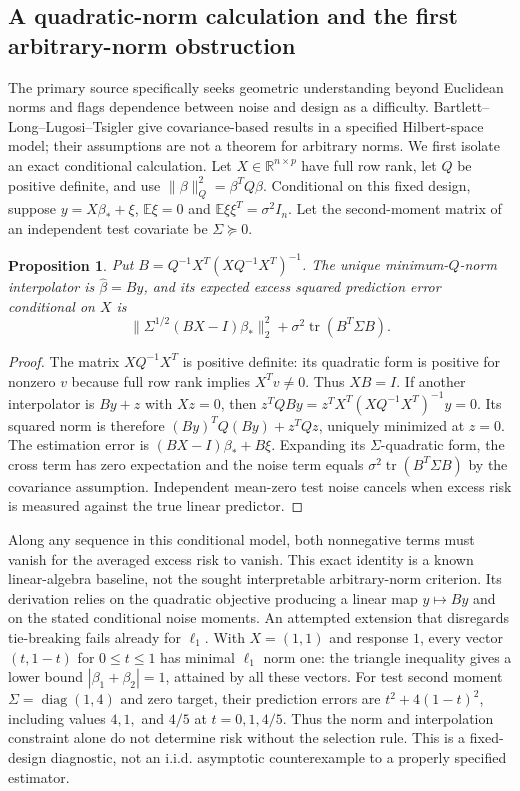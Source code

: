\documentclass[11pt]{article}
\newtheorem{proposition}{Proposition}
\begin{document}
\subsection{A quadratic-norm calculation and the first arbitrary-norm obstruction}
The primary source specifically seeks geometric understanding beyond Euclidean norms and flags dependence between noise and design as a difficulty. Bartlett--Long--Lugosi--Tsigler give covariance-based results in a specified Hilbert-space model; their assumptions are not a theorem for arbitrary norms. We first isolate an exact conditional calculation. Let $X\in\mathbb R^{n\times p}$ have full row rank, let $Q$ be positive definite, and use $\|\beta\|_Q^2=\beta^TQ\beta$. Conditional on this fixed design, suppose $y=X\beta_*+\xi$, $\mathbb E\xi=0$ and $\mathbb E\xi\xi^T=\sigma^2I_n$. Let the second-moment matrix of an independent test covariate be $\Sigma\succeq0$.
\begin{proposition}
Put $B=Q^{-1}X^T(XQ^{-1}X^T)^{-1}$. The unique minimum-$Q$-norm interpolator is $\widehat\beta=By$, and its expected excess squared prediction error conditional on $X$ is
\[
\|\Sigma^{1/2}(BX-I)\beta_*\|_2^2+\sigma^2\operatorname{tr}(B^T\Sigma B).
\]
\end{proposition}
\begin{proof}
The matrix $XQ^{-1}X^T$ is positive definite: its quadratic form is positive for nonzero $v$ because full row rank implies $X^Tv\ne0$. Thus $XB=I$. If another interpolator is $By+z$ with $Xz=0$, then $z^TQBy=z^TX^T(XQ^{-1}X^T)^{-1}y=0$. Its squared norm is therefore $(By)^TQ(By)+z^TQz$, uniquely minimized at $z=0$. The estimation error is $(BX-I)\beta_*+B\xi$. Expanding its $\Sigma$-quadratic form, the cross term has zero expectation and the noise term equals $\sigma^2\operatorname{tr}(B^T\Sigma B)$ by the covariance assumption. Independent mean-zero test noise cancels when excess risk is measured against the true linear predictor.
\end{proof}
Along any sequence in this conditional model, both nonnegative terms must vanish for the averaged excess risk to vanish. This exact identity is a known linear-algebra baseline, not the sought interpretable arbitrary-norm criterion. Its derivation relies on the quadratic objective producing a linear map $y\mapsto By$ and on the stated conditional noise moments.
An attempted extension that disregards tie-breaking fails already for $\ell_1$. With $X=(1,1)$ and response $1$, every vector $(t,1-t)$ for $0\le t\le1$ has minimal $\ell_1$ norm one: the triangle inequality gives a lower bound $|\beta_1+\beta_2|=1$, attained by all these vectors. For test second moment $\Sigma=\operatorname{diag}(1,4)$ and zero target, their prediction errors are $t^2+4(1-t)^2$, including values $4,1,$ and $4/5$ at $t=0,1,4/5$. Thus the norm and interpolation constraint alone do not determine risk without the selection rule. This is a fixed-design diagnostic, not an i.i.d. asymptotic counterexample to a properly specified estimator.
\end{document}
